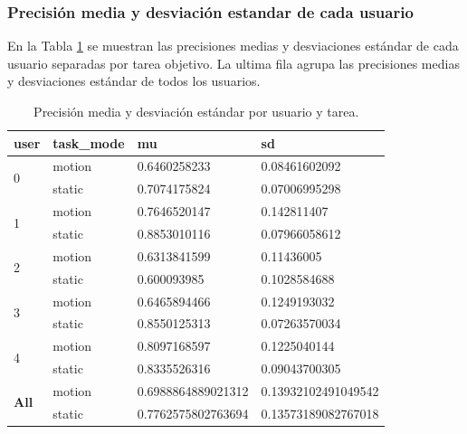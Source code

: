 \subsubsection{Precisión media y desviación estandar de cada usuario}

En la Tabla \ref{tab:mu_sd_users_task} se muestran las precisiones medias y desviaciones estándar de cada usuario separadas por tarea objetivo. La ultima fila agrupa las precisiones medias y desviaciones estándar de todos los usuarios.

\begin{table}[H]
  \centering
  \begin{tabular}{|l|l|l|l|}
    \hline
    user                            & task\_mode & mu                 & sd                  \\ \hline
    \multirow{2}{4em}{0}            & motion     & 0.6460258233       & 0.08461602092       \\ \cline{2-4}
                                    & static     & 0.7074175824       & 0.07006995298       \\ \hline
    \multirow{2}{4em}{1}            & motion     & 0.7646520147       & 0.142811407         \\ \cline{2-4}
                                    & static     & 0.8853010116       & 0.07966058612       \\ \hline
    \multirow{2}{4em}{2}            & motion     & 0.6313841599       & 0.11436005          \\ \cline{2-4}
                                    & static     & 0.600093985        & 0.1028584688        \\ \hline
    \multirow{2}{4em}{3}            & motion     & 0.6465894466       & 0.1249193032        \\ \cline{2-4}
                                    & static     & 0.8550125313       & 0.07263570034       \\ \hline
    \multirow{2}{4em}{4}            & motion     & 0.8097168597       & 0.1225040144        \\ \cline{2-4}
                                    & static     & 0.8335526316       & 0.09043700305       \\ \hline
    \multirow{2}{4em}{\textbf{All}} & motion     & 0.6988864889021312 & 0.13932102491049542 \\ \cline{2-4}
                                    & static     & 0.7762575802763694 & 0.13573189082767018 \\ \hline
  \end{tabular}
  \caption{Precisión media y desviación estándar por usuario y tarea.}
  \label{tab:mu_sd_users_task}
\end{table}

